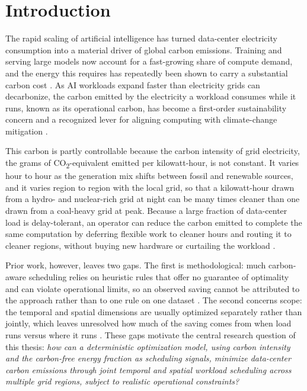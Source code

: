 \section{Introduction}
\label{sec:intro}

The rapid scaling of artificial intelligence has turned data-center electricity consumption into a material driver of global carbon emissions. Training and serving large models now account for a fast-growing share of compute demand, and the energy this requires has repeatedly been shown to carry a substantial carbon cost \citep{strubell2019energy, patterson2022carbon, faiz2024llmcarbon}. As AI workloads expand faster than electricity grids can decarbonize, the carbon emitted by the electricity a workload consumes while it runs, known as its operational carbon, has become a first-order sustainability concern and a recognized lever for aligning computing with climate-change mitigation \citep{kaack2022aligning, li2025llm}.

This carbon is partly controllable because the carbon intensity of grid electricity, the grams of CO\textsubscript{2}-equivalent emitted per kilowatt-hour, is not constant. It varies hour to hour as the generation mix shifts between fossil and renewable sources, and it varies region to region with the local grid, so that a kilowatt-hour drawn from a hydro- and nuclear-rich grid at night can be many times cleaner than one drawn from a coal-heavy grid at peak. Because a large fraction of data-center load is delay-tolerant, an operator can reduce the carbon emitted to complete the same computation by deferring flexible work to cleaner hours and routing it to cleaner regions, without buying new hardware or curtailing the workload \citep{radovanovic2023, acun2023carbonexplorer, lindberg2022geographic}.

Prior work, however, leaves two gaps. The first is methodological: much carbon-aware scheduling relies on heuristic rules that offer no guarantee of optimality and can violate operational limits, so an observed saving cannot be attributed to the approach rather than to one rule on one dataset \citep{radovanovic2023, wijayawardana2025scheduling}. The second concerns scope: the temporal and spatial dimensions are usually optimized separately rather than jointly, which leaves unresolved how much of the saving comes from when load runs versus where it runs \citep{liu2012, sukprasert2024limitations}. These gaps motivate the central research question of this thesis: \emph{how can a deterministic optimization model, using carbon intensity and the carbon-free energy fraction as scheduling signals, minimize data-center carbon emissions through joint temporal and spatial workload scheduling across multiple grid regions, subject to realistic operational constraints?}

